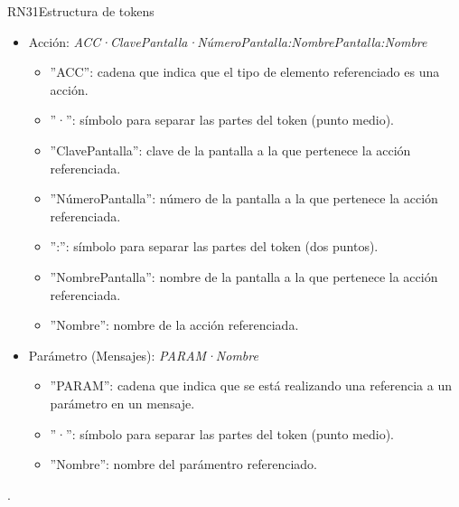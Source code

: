 \begin{BussinesRule}{RN31}{Estructura de tokens}
\begin{itemize}
\begin{itemize}
			\item ''P'': cadena que indica que el tipo de elemento referenciado es un paso.
			\item ''·'':  símbolo para separar las partes del token (punto medio).
			\item ''ClaveCasoUso'': clave del caso de uso al que pertenece el paso referenciado.
			\item ''NúmeroCasoUso'': número del caso de uso al que pertenece el paso referenciado.
			\item '':'': símbolo para separar las partes del token (dos puntos).
			\item ''NombreCasoUso'': nombre del caso de uso al que pertenece el paso referenciado.
			\item ''ClaveTrayectoria'': clave de la trayectoria a la que pertenece el paso referenciado.
			\item ''Número'': número del paso referenciado.
		\end{itemize}
	\item Acción: {\em ACC·ClavePantalla·NúmeroPantalla:NombrePantalla:Nombre}
		\begin{itemize}
			\item ''ACC'': cadena que indica que el tipo de elemento referenciado es una acción.
			\item ''·'':  símbolo para separar las partes del token (punto medio).
			\item ''ClavePantalla'': clave de la pantalla a la que pertenece la acción referenciada.
			\item ''NúmeroPantalla'': número de la pantalla a la que pertenece la acción referenciada.
			\item '':'': símbolo para separar las partes del token (dos puntos).
			\item ''NombrePantalla'': nombre de la pantalla a la que pertenece la acción referenciada.
			\item ''Nombre'': nombre de la acción referenciada.
		\end{itemize}
	\item Parámetro (Mensajes): {\em PARAM·Nombre}
		\begin{itemize}
			\item ''PARAM'': cadena que indica que se está realizando una referencia a un parámetro en un mensaje.
			\item ''·'':  símbolo para separar las partes del token (punto medio).
			\item ''Nombre'': nombre del parámentro referenciado.
		\end{itemize}
	\end{itemize}
	 . 
\end{BussinesRule}


